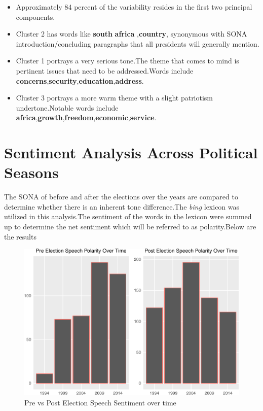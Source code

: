 \documentclass[]{article}
\begin{document}
\begin{itemize}

\item Approximately 84 percent of the variability resides in the first two principal components.
\item Cluster 2 has words like \textbf{south} \textbf{africa} ,\textbf{country}, synonymous with SONA introduction/concluding paragraphs that all presidents will generally mention.
\item Cluster 1 portrays a very serious tone.The theme that comes to mind is pertinent issues that need to be addressed.Words include \textbf{concerns},\textbf{security},\textbf{education},\textbf{address}.
\item Cluster 3 portrays a more warm theme with a slight patriotism undertone.Notable words include \textbf{africa},\textbf{growth},\textbf{freedom},\textbf{economic},\textbf{service}.
\end{itemize}

\section{Sentiment Analysis Across Political Seasons}

The SONA of before and after the elections over the years are compared
to determine whether there is an inherent tone difference.The
\emph{bing} lexicon was utilized in this analysis.The sentiment of the
words in the lexicon were summed up to determine the net sentiment which
will be referred to as polarity.Below are the results

\begin{figure}[H]

{\centering \includegraphics{datasci_fi_Assignment_2_files/figure-latex/pre_post_sentiment -1} 

}

\caption{Pre vs Post Election Speech Sentiment over time}\label{fig:pre_post_sentiment }
\end{figure}
\end{document}
